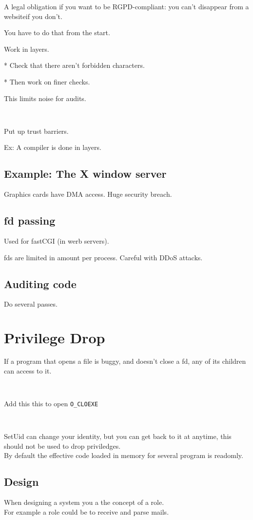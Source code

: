 \documentclass[a4paper,11pt]{article}
\begin{document}
A legal obligation if you want to be RGPD-compliant: you can't disappear from a
websiteif you don't.

You have to do that from the start.

Work in layers.

* Check that there aren't forbidden characters.

* Then work on finer checks.

This limits noise for audits.

\

Put up trust barriers.

Ex: A compiler is done in layers.

\subsection{Example: The X window server}

Graphics cards have DMA access. Huge security breach.

\subsection{fd passing}

Used for fastCGI (in werb servers).

fds are limited in amount per process. Careful with DDoS attacks.

\subsection{Auditing code}

Do several passes.

\section{Privilege Drop}
If a program that opens a file is buggy, and doesn't close a fd, any of its children can access to it.

\

Add this this to open \texttt{O\_CLOEXE}

\

SetUid can change your identity, but you can get back to it at anytime, this should not be used to drop priviledges.\\
By default the effective code loaded in memory for several program is readomly.

\subsection{Design}
When designing a system you a the concept of a role.\\
For example a role could be to receive and parse mails.\\
\end{document}
